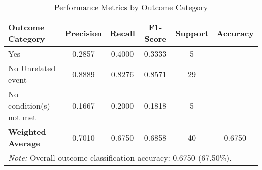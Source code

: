 \begin{table}[!ht]
\centering
\caption{Performance Metrics by Outcome Category}
\label{tab:classification_metrics}
\begin{tabular}{lccccc}
\toprule
\textbf{Outcome Category} & \textbf{Precision} & \textbf{Recall} & \textbf{F1-Score} & \textbf{Support} & \textbf{Accuracy} \\
\midrule
Yes & 0.2857 & 0.4000 & 0.3333 & 5 & \multirow{1}{*}{} \\
No \- Unrelated event & 0.8889 & 0.8276 & 0.8571 & 29 & \multirow{1}{*}{} \\
No \- condition(s) not met & 0.1667 & 0.2000 & 0.1818 & 5 & \multirow{1}{*}{} \\
\midrule
\textbf{Weighted Average} & 0.7010 & 0.6750 & 0.6858 & 40 & 0.6750 \\
\bottomrule
\multicolumn{6}{p{14cm}}{\textit{Note:} Overall outcome classification accuracy: 0.6750 (67.50\%).} \\
\end{tabular}
\end{table}
